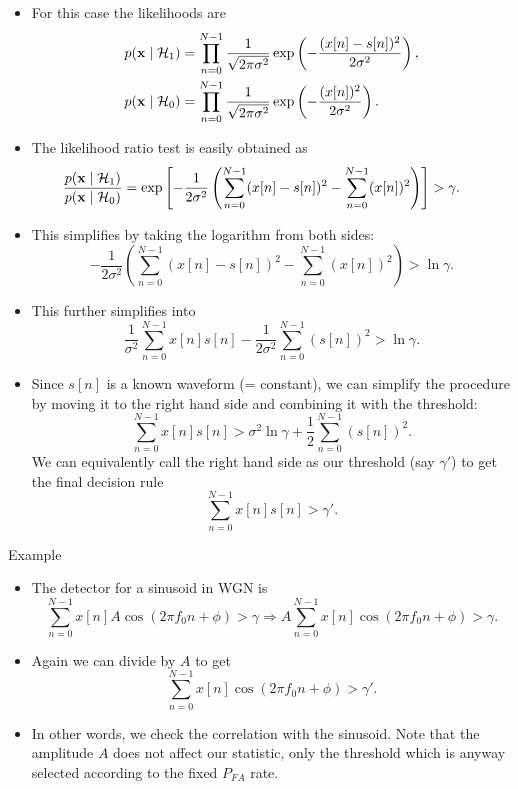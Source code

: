 \documentclass[10pt, aspectratio=169]{beamer} %
\newcommand{\x}{{\bf x}}
\begin{document}
\begin{frame}[allowframebreaks=0.8]
\begin{itemize}
\item For this case the likelihoods are
\begin{align*}
p(\x\mid {\cal H}_1) & =  \prod_{n=0}^{N-1}\frac{1}{\sqrt{2\pi\sigma^2}}\exp\left(-\frac{(x[n]-s[n])^2}{2\sigma^2}\right),\\
p(\x\mid {\cal H}_0) & =  \prod_{n=0}^{N-1}\frac{1}{\sqrt{2\pi\sigma^2}}\exp\left(-\frac{(x[n])^2}{2\sigma^2}\right).
\end{align*}
\item The likelihood ratio test is easily obtained as
\[
\hspace*{-0.5cm}
\frac{p(\x\mid {\cal H}_1)}{p(\x\mid {\cal H}_0)} = \exp\left[ -\frac{1}{2\sigma^2} \left( \sum_{n=0}^{N-1}(x[n]-s[n])^2 - \sum_{n=0}^{N-1}(x[n])^2 \right)\right] > \gamma.
\]
\item This simplifies by taking the logarithm from both sides:
\[
-\frac{1}{2\sigma^2} \left( \sum_{n=0}^{N-1}(x[n]-s[n])^2 - \sum_{n=0}^{N-1}(x[n])^2 \right) > \ln \gamma.
\]
\item This further simplifies into
\[
\frac{1}{\sigma^2} \sum_{n=0}^{N-1}x[n]s[n] - \frac{1}{2\sigma^2}\sum_{n=0}^{N-1}(s[n])^2 > \ln \gamma.
\]
\item Since $s[n]$ is a known waveform (= constant), we can simplify the procedure by moving
it to the right hand side and combining it with the threshold:
\[
 \sum_{n=0}^{N-1}x[n]s[n]  > \sigma^2 \ln \gamma + \frac{1}{2}\sum_{n=0}^{N-1}(s[n])^2.
\]
We can equivalently call the right hand side as our threshold (say $\gamma'$) to get the
final decision rule
\[
 \sum_{n=0}^{N-1}x[n]s[n]  > \gamma'.
\]

\end{itemize}
\end{frame}

\begin{frame}[allowframebreaks=0.8]
 {Example}
 
\begin{itemize}
\item The detector for a sinusoid in WGN is
{\small
\[
 \sum_{n=0}^{N-1}x[n] A\cos(2\pi f_0 n + \phi)  > \gamma \Rightarrow A \sum_{n=0}^{N-1}x[n] \cos(2\pi f_0 n + \phi) > \gamma.
\]}
\item Again we can divide by $A$ to get 
{\small
\[
\sum_{n=0}^{N-1}x[n] \cos(2\pi f_0 n + \phi) > \gamma'.
\]
}
\item In other words, we check the correlation with the sinusoid. Note that the
amplitude $A$ does not affect our statistic, only the threshold which is
anyway selected according to the fixed $P_{FA}$ rate.
\end{itemize}
\end{frame}
\end{document}
